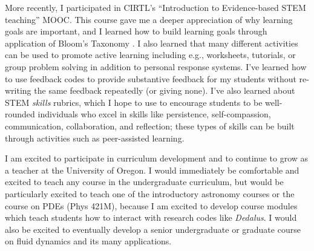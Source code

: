 \documentclass[11pt]{article}
\begin{document}
More recently, I participated in CIRTL's ``Introduction to Evidence-based STEM teaching'' MOOC.
This course gave me a deeper appreciation of why learning goals are important, and I learned how to build learning goals through application of Bloom's Taxonomy \citep{simon_taylor_2008}.
I also learned that many different activities can be used to promote active learning including e.g., worksheets, tutorials, or group problem solving in addition to personal response systems.
I've learned how to use feedback codes to provide substantive feedback for my students without re-writing the same feedback repeatedly (or giving none).
I've also learned about STEM \emph{skills} rubrics, which I hope to use to encourage students to be well-rounded individuals who excel in skills like persistence, self-compassion, communication, collaboration, and reflection; these types of skills can be built through activities such as peer-assisted learning.


I am excited to participate in curriculum development and to continue to grow as a teacher at the University of Oregon.
I would immediately be comfortable and excited to teach any course in the undergraduate curriculum, but would be particularly excited to teach one of the introductory astronomy courses or the course on PDEs (Phys 421M), because I am excited to develop course modules which teach students how to interact with research codes like \emph{Dedalus}.
I would also be excited to eventually develop a senior undergraduate or graduate course on fluid dynamics and its many applications.


{\scriptsize

}
\end{document}

